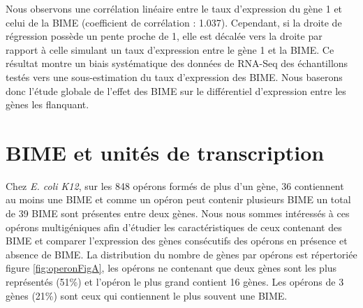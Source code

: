 \documentclass[12pt,a4paper]{report}
\begin{document}
\begin{onehalfspace}
Nous observons une corrélation linéaire entre le taux d'expression du gène 1 et celui de la BIME (coefficient de corrélation : 1.037). Cependant, si la droite de régression possède un pente proche de 1, elle est décalée vers la droite par rapport à celle simulant un taux d'expression entre le gène 1 et la BIME. Ce résultat montre un biais systématique des données de RNA-Seq des échantillons testés vers une sous-estimation du taux d'expression des BIME. Nous baserons donc l'étude globale de l'effet des BIME sur le différentiel d'expression entre les gènes les flanquant.

\section*{BIME et unités de transcription}
Chez \textit{E. coli K12}, sur les 848 opérons formés de plus d'un gène, 36 contiennent au moins une BIME et comme un opéron peut contenir plusieurs BIME un total de 39 BIME sont présentes entre deux gènes. Nous nous sommes intéressés à ces opérons multigéniques afin d'étudier les caractéristiques de ceux contenant des BIME et comparer l'expression des gènes consécutifs des opérons en présence et absence de BIME. La distribution du nombre de gènes par opérons est répertoriée figure \autoref{fig:operonFigA}, les opérons ne contenant que deux gènes sont les plus représentés (51\%) et l'opéron le plus grand contient 16 gènes. Les opérons de 3 gènes (21\%) sont ceux qui contiennent le plus souvent une BIME.


\end{onehalfspace}
\end{document}
